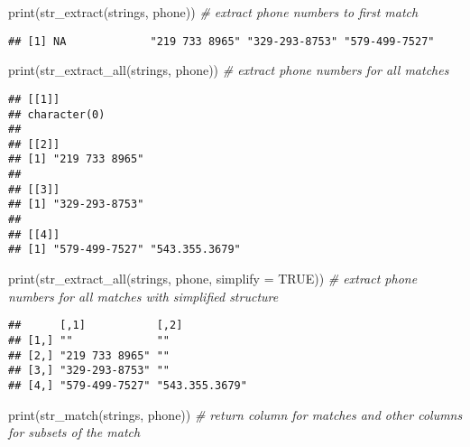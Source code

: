 \documentclass[
]{article}
\newenvironment{Shaded}{\begin{snugshade}}{\end{snugshade}}
\newcommand{\AttributeTok}[1]{\textcolor[rgb]{0.77,0.63,0.00}{#1}}
\newcommand{\CommentTok}[1]{\textcolor[rgb]{0.56,0.35,0.01}{\textit{#1}}}
\newcommand{\ConstantTok}[1]{\textcolor[rgb]{0.00,0.00,0.00}{#1}}
\newcommand{\FunctionTok}[1]{\textcolor[rgb]{0.00,0.00,0.00}{#1}}
\newcommand{\NormalTok}[1]{#1}
\begin{document}
\begin{Shaded}
\begin{Highlighting}[]
\FunctionTok{print}\NormalTok{(}\FunctionTok{str\_extract}\NormalTok{(strings, phone)) }\CommentTok{\# extract phone numbers to first match}
\end{Highlighting}
\end{Shaded}

\begin{verbatim}
## [1] NA             "219 733 8965" "329-293-8753" "579-499-7527"
\end{verbatim}

\begin{Shaded}
\begin{Highlighting}[]
\FunctionTok{print}\NormalTok{(}\FunctionTok{str\_extract\_all}\NormalTok{(strings, phone)) }\CommentTok{\# extract phone numbers for all matches}
\end{Highlighting}
\end{Shaded}

\begin{verbatim}
## [[1]]
## character(0)
## 
## [[2]]
## [1] "219 733 8965"
## 
## [[3]]
## [1] "329-293-8753"
## 
## [[4]]
## [1] "579-499-7527" "543.355.3679"
\end{verbatim}

\begin{Shaded}
\begin{Highlighting}[]
\FunctionTok{print}\NormalTok{(}\FunctionTok{str\_extract\_all}\NormalTok{(strings, phone, }\AttributeTok{simplify =} \ConstantTok{TRUE}\NormalTok{)) }\CommentTok{\# extract phone numbers for all matches with simplified structure}
\end{Highlighting}
\end{Shaded}

\begin{verbatim}
##      [,1]           [,2]          
## [1,] ""             ""            
## [2,] "219 733 8965" ""            
## [3,] "329-293-8753" ""            
## [4,] "579-499-7527" "543.355.3679"
\end{verbatim}

\begin{Shaded}
\begin{Highlighting}[]
\FunctionTok{print}\NormalTok{(}\FunctionTok{str\_match}\NormalTok{(strings, phone)) }\CommentTok{\# return column for matches and other columns for subsets of the match}
\end{Highlighting}
\end{Shaded}
\end{document}
